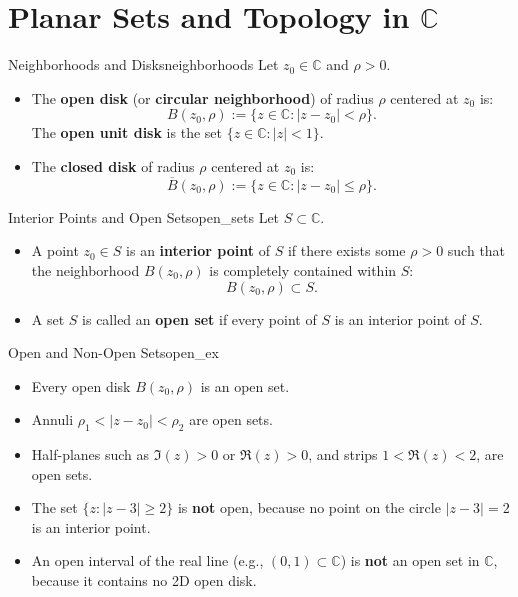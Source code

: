 \section{Planar Sets and Topology in \texorpdfstring{$\mathbb{C}$}{C}}

\begin{definition}{Neighborhoods and Disks}{neighborhoods}
Let $z_0 \in \mathbb{C}$ and $\rho > 0$.
\begin{itemize}
    \item The \textbf{open disk} (or \textbf{circular neighborhood}) of radius $\rho$ centered at $z_0$ is:
    \begin{equation}
    B(z_0, \rho) := \{z \in \mathbb{C} : |z - z_0| < \rho\}.
    \end{equation}
    The \textbf{open unit disk} is the set $\{z \in \mathbb{C} : |z| < 1\}$.
    \item The \textbf{closed disk} of radius $\rho$ centered at $z_0$ is:
    \begin{equation}
    \overline{B}(z_0, \rho) := \{z \in \mathbb{C} : |z - z_0| \le \rho\}.
    \end{equation}
\end{itemize}
\end{definition}

\begin{definition}{Interior Points and Open Sets}{open_sets}
Let $S \subset \mathbb{C}$.
\begin{itemize}
    \item A point $z_0 \in S$ is an \textbf{interior point} of $S$ if there exists some $\rho > 0$ such that the neighborhood $B(z_0, \rho)$ is completely contained within $S$:
    \begin{equation}
    B(z_0, \rho) \subset S.
    \end{equation}
    \item A set $S$ is called an \textbf{open set} if every point of $S$ is an interior point of $S$.
\end{itemize}
\end{definition}

\begin{example}{Open and Non-Open Sets}{open_ex}
\begin{itemize}
    \item Every open disk $B(z_0, \rho)$ is an open set.
    \item Annuli $\rho_1 < |z - z_0| < \rho_2$ are open sets.
    \item Half-planes such as $\Im(z) > 0$ or $\Re(z) > 0$, and strips $1 < \Re(z) < 2$, are open sets.
    \item The set $\{z : |z - 3| \ge 2\}$ is \textbf{not} open, because no point on the circle $|z - 3| = 2$ is an interior point.
    \item An open interval of the real line (e.g., $(0, 1) \subset \mathbb{C}$) is \textbf{not} an open set in $\mathbb{C}$, because it contains no 2D open disk.
\end{itemize}
\end{example}

